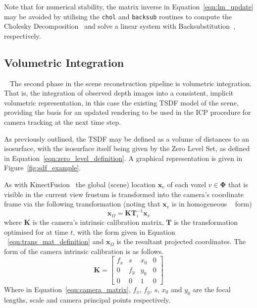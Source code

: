Note that for numerical stability, the matrix inverse in Equation~\ref{eqn:lm_update} 
may be avoided by utilising the \texttt{chol} and \texttt{backsub} routines to 
compute the Cholesky Decomposition~\cite{CHOL} and solve a linear system with 
Backsubstitution~\cite{BACKSUB}, respectively.

\subsection{Volumetric Integration}
~\label{subsec:moseg_static_integration}
The second phase in the scene reconstruction pipeline is volumetric integration.
That is, the integration of observed depth images into a consistent, implicit
volumetric representation, in this case the existing TSDF model of the scene,
providing the basis for an updated rendering to be used in the ICP procedure
for camera tracking at the next time step.

As previously outlined, the TSDF may be defined as a volume of distances to an
isosurface, with the isosurface itself being given by the Zero Level Set, as
defined in Equation~\ref{eqn:zero_level_definition}. A graphical representation
is given in Figure~\ref{fig:sdf_example}.

As with KinectFusion~\cite{Newcombe2011} the global (scene) location
\(\bm{x}_{v}\) of each voxel \(v \in \bm{\Phi}\) that is visible in the
current view frustum is transformed into the camera's coordinate frame via the
following transformation (noting that \(\bm{x}_{v}\) is in homogeneous 
~\cite{HOMOGENEOUS} form)
\begin{equation}
\label{eqn:project_tsdf_to_image}
\bm{x}_{\Omega} = \bm{K}\bm{T}_i^{-1}\bm{x}_{v}
\end{equation}
where \(\bm{K}\) is the camera's intrinsic calibration matrix, \(\bm{T}\) is
the transformation optimised for at time \(t\), with the form given in Equation
~\ref{eqn:trans_mat_definition} and \(\bm{x}_{\Omega}\) is the resultant
projected coordinates. The form of the camera intrinsic calibration is as 
follows.
\begin{equation}
  \label{eqn:camera_matrix}
  \bm{K} = 
  \begin{bmatrix}
    f_{x} & s & x_{0} & 0\\
    0 & f_{y} & y_{0} & 0\\
    0 & 0 & 1 & 0
  \end{bmatrix}
\end{equation}
Where in Equation~\ref{eqn:camera_matrix}, \(f_{x}\), \(f_{y}\), \(s\), \(x_{0}\) 
and \(y_{0}\) are the focal lengths, scale and camera principal points respectively.

